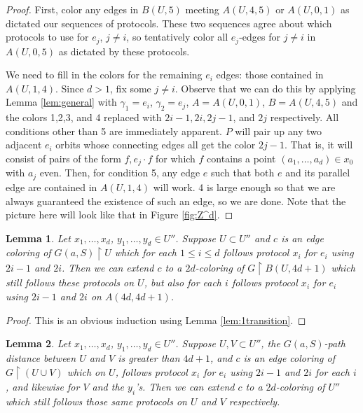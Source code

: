 \documentclass[12pt]{article}
\newcommand{\0}{\varnothing}
\newcommand{\res}{\upharpoonright}
\newtheorem{lemma}{Lemma}
\begin{document}
\begin{proof}
First, color any edges in $B(U,5)$ meeting $A(U,4,5)$ or $A(U,0,1)$ as dictated our sequences of protocols. These two sequences agree about which protocols to use for $e_j$, $j \neq i$, so tentatively color all $e_j$-edges for $j \neq i$ in $A(U,0,5)$ as dictated by these protocols.

We need to fill in the colors for the remaining $e_i$ edges: those contained in $A(U,1,4)$. Since $d > 1$, fix some $j \neq i$. Observe that we can do this by applying Lemma \ref{lem:general} with $\gamma_1 = e_i$, $\gamma_2 = e_j$, $A = A(U,0,1)$, $B = A(U,4,5)$ and the colors 1,2,3, and 4 replaced with $2i-1,2i,2j-1$, and $2j$ respectively. All conditions other than 5 are immediately apparent. $P$ will pair up any two adjacent $e_i$ orbits whose connecting edges all get the color $2j-1$. That is, it will consist of pairs of the form $f,e_j \cdot f$ for which $f$ contains a point $(a_1,\ldots,a_d) \in x_0$ with $a_j$ even. Then, for condition 5, any edge $e$ such that both $e$ and its parallel edge are contained in $A(U,1,4)$ will work. 4 is large enough so that we are always guaranteed the existence of such an edge, so we are done. Note that the picture here will look like that in Figure \ref{fig:Z^d}.
\end{proof}

\begin{lemma}\label{lem:fulltransition}
Let $x_1,\ldots,x_d$, $y_1,\ldots,y_d \in U''$. Suppose $U \subset U''$ and $c$ is an edge coloring of $G(a,S) \res U$ which for each $1 \leq i \leq d$ follows protocol $x_i$ for $e_i$ using $2i - 1$ and $2i$. Then we can extend $c$ to a $2d$-coloring of $G \res B(U,4d+1)$ which still follows these protocols on $U$, but also for each $i$ follows protocol $x_i$ for $e_i$ using $2i - 1$ and $2i$ on $A(4d,4d+1)$.
\end{lemma}

\begin{proof}
This is an obvious induction using Lemma \ref{lem:1transition}.
\end{proof}

\begin{lemma}\label{lem:2sets}
Let $x_1,\ldots,x_d$, $y_1,\ldots,y_d \in U''$. Suppose $U,V \subset U''$, the $G(a,S)$-path distance between $U$ and $V$ is greater than $4d+1$, and $c$ is an edge coloring of $G \res (U \cup V)$ which on $U$, follows protocol $x_i$ for $e_i$ using $2i-1$ and $2i$ for each $i$, and likewise for $V$ and the $y_i$'s. Then we can extend $c$ to a $2d$-coloring of $U''$ which still follows those same protocols on $U$ and $V$ respectively.
\end{lemma}
\end{document}
